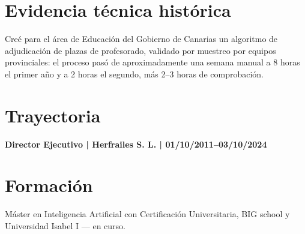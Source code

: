 \documentclass[11pt,a4paper]{article}
\begin{document}
\section*{Evidencia técnica histórica}
Creé para el área de Educación del Gobierno de Canarias un algoritmo de adjudicación de plazas de profesorado, validado por muestreo por equipos provinciales: el proceso pasó de aproximadamente una semana manual a 8 horas el primer año y a 2 horas el segundo, más 2–3 horas de comprobación.

\section*{Trayectoria}
\textbf{Director Ejecutivo | Herfrailes S. L. | 01/10/2011–03/10/2024}

\section*{Formación}
Máster en Inteligencia Artificial con Certificación Universitaria, BIG school y Universidad Isabel I — en curso.\\
\end{document}
